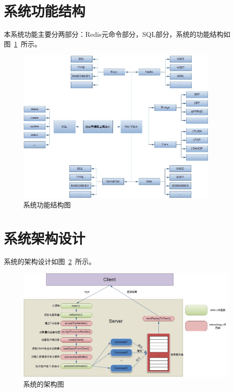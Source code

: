 \documentclass{zjutthesis}
\begin{document}
\section{系统功能结构}
本系统功能主要分两部分：Redis元命令部分，SQL部分，系统的功能结构如图~\ref{fig:Command}~所示。
\begin{figure}[H]
\centering
\includegraphics[width=0.9\textwidth]{Command}
\caption{系统功能结构图}\label{fig:Command}
\vspace{\baselineskip} %
\end{figure}

\section{系统架构设计}

系统的架构设计如图~\ref{fig:System}~所示。
\begin{figure}[H]
\centering
\includegraphics[width=\textwidth]{System}
\caption{系统的架构图}\label{fig:System}
\vspace{\baselineskip} %
\end{figure}
\end{document}
